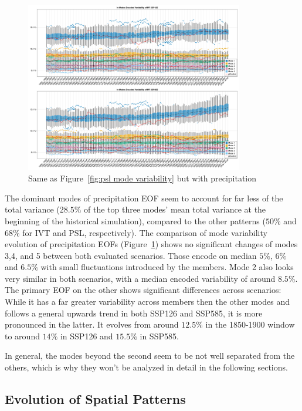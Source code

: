 \begin{figure}[htb]
  \begin{center}
    \includegraphics[width=0.85\textwidth]{figures/mode_variability_pr_50seasons.png}
  \end{center}
  \caption{Same as Figure~\ref{fig:psl mode variability} but with precipitation}\label{fig:pr mode variability}
\end{figure}

The dominant modes of precipitation EOF seem to account for far less of the total variance ($28.5 \%$ of the top three modes' mean total variance at the beginning of the historical simulation), compared to the other patterns ($50 \%$ and $68 \%$ for IVT and PSL, respectively).  
The comparison of mode variability evolution of precipitation EOFs (Figure~\ref{fig:pr mode variability}) shows no significant changes of modes 3,4, and 5 between both evaluated scenarios. 
Those encode on median $5\%$, $6\%$ and $6.5\%$ with small fluctuations introduced by the members. 
Mode 2 also looks very similar in both scenarios, with a median encoded variability of around $8.5\%$. 
The primary EOF on the other shows significant differences across scenarios: While it has a far greater variability across members then the other modes and follows a general upwards trend in both SSP126 and SSP585, it is more pronounced in the latter. 
It evolves from around $12.5\%$ in the 1850-1900 window to around $14\%$ in SSP126 and $15.5\%$ in SSP585.  


In general, the modes beyond the second seem to be not well separated from the others, which is why they won't be analyzed in detail in the following sections. 

\subsection{Evolution of Spatial Patterns}

